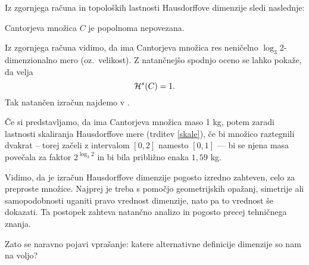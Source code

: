 Iz zgornjega računa in topoloških lastnosti Hausdorffove dimenzije sledi naslednje:
\begin{posledica}
    Cantorjeva množica \(C\) je popolnoma nepovezana.
\end{posledica}

\begin{opomba}
    Iz zgornjega računa vidimo, da ima Cantorjeva množica res neničelno \(\log_3 2\)-dimenzionalno mero (oz.\ velikost). Z natančnejšo spodnjo oceno se lahko pokaže, da velja
    \[
        \mathcal{H}^s(C) = 1.
    \]
    Tak natančen izračun najdemo v \cite{pearse2014}.

    Če si predstavljamo, da ima Cantorjeva množica maso 1 kg, potem zaradi lastnosti skaliranja Hausdorffove mere (trditev \ref{skale}), če bi množico raztegnili dvakrat -- torej začeli z intervalom \([0,2]\) namesto \([0,1]\) — bi se njena masa povečala za faktor \(2^{\log_3 2}\) in bi bila približno enaka \(1,59\) kg.
\end{opomba}

Vidimo, da je izračun Hausdorffove dimenzije pogosto izredno zahteven, celo za preproste množice. Najprej je treba s pomočjo geometrijskih opažanj, simetrije ali samopodobnosti uganiti pravo vrednost dimenzije, nato pa to vrednost še dokazati. Ta postopek zahteva natančno analizo in pogosto precej tehničnega znanja.

Zato se naravno pojavi vprašanje: katere alternativne definicije dimenzije so nam na voljo?
